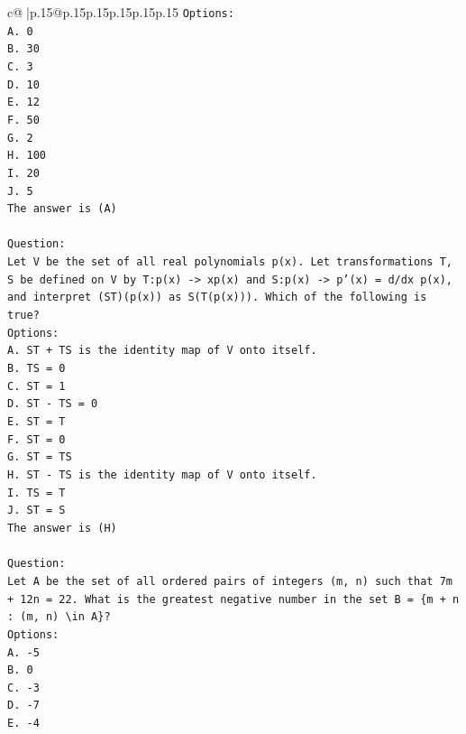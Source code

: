 \documentclass{article}
\begin{document}
{\begin{supertabular}{c@{$\;$}|p{.15\linewidth}@{}p{.15\linewidth}p{.15\linewidth}p{.15\linewidth}p{.15\linewidth}p{.15\linewidth}}
{{{\texttt{Options:} \\
\texttt{A. 0} \\
\texttt{B. 30} \\
\texttt{C. 3} \\
\texttt{D. 10} \\
\texttt{E. 12} \\
\texttt{F. 50} \\
\texttt{G. 2} \\
\texttt{H. 100} \\
\texttt{I. 20} \\
\texttt{J. 5} \\
\texttt{The answer is (A)} \\
\\ 
\texttt{Question:} \\
\texttt{Let V be the set of all real polynomials p(x). Let transformations T, S be defined on V by T:p(x) {-}> xp(x) and S:p(x) {-}> p'(x) = d/dx p(x), and interpret (ST)(p(x)) as S(T(p(x))). Which of the following is true?} \\
\texttt{Options:} \\
\texttt{A. ST + TS is the identity map of V onto itself.} \\
\texttt{B. TS = 0} \\
\texttt{C. ST = 1} \\
\texttt{D. ST {-} TS = 0} \\
\texttt{E. ST = T} \\
\texttt{F. ST = 0} \\
\texttt{G. ST = TS} \\
\texttt{H. ST {-} TS is the identity map of V onto itself.} \\
\texttt{I. TS = T} \\
\texttt{J. ST = S} \\
\texttt{The answer is (H)} \\
\\ 
\texttt{Question:} \\
\texttt{Let A be the set of all ordered pairs of integers (m, n) such that 7m + 12n = 22. What is the greatest negative number in the set B = \{m + n : (m, n) \textbackslash{}in A\}?} \\
\texttt{Options:} \\
\texttt{A. {-}5} \\
\texttt{B. 0} \\
\texttt{C. {-}3} \\
\texttt{D. {-}7} \\
\texttt{E. {-}4} \\
}}}
\end{supertabular}}
\end{document}
